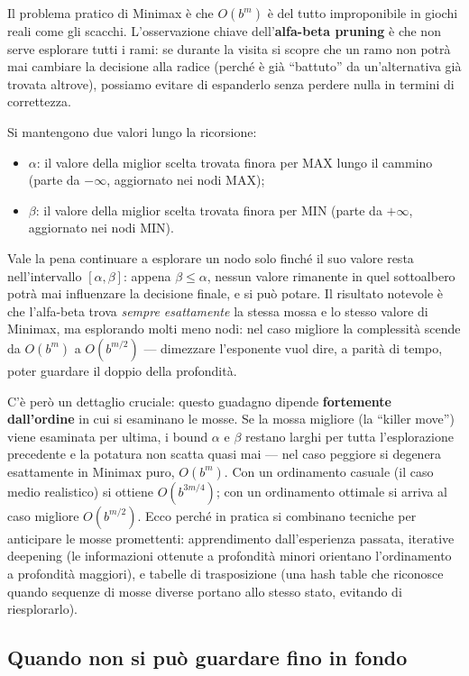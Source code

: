 \documentclass[11pt,a4paper]{article}
\begin{document}
Il problema pratico di Minimax è che $O(b^m)$ è del tutto improponibile in giochi reali come gli scacchi. L'osservazione chiave dell'\textbf{alfa-beta pruning} è che non serve esplorare tutti i rami: se durante la visita si scopre che un ramo non potrà mai cambiare la decisione alla radice (perché è già ``battuto'' da un'alternativa già trovata altrove), possiamo evitare di espanderlo senza perdere nulla in termini di correttezza.

Si mantengono due valori lungo la ricorsione:
\begin{itemize}
  \item $\alpha$: il valore della miglior scelta trovata finora per MAX lungo il cammino (parte da $-\infty$, aggiornato nei nodi MAX);
  \item $\beta$: il valore della miglior scelta trovata finora per MIN (parte da $+\infty$, aggiornato nei nodi MIN).
\end{itemize}

Vale la pena continuare a esplorare un nodo solo finché il suo valore resta nell'intervallo $[\alpha,\beta]$: appena $\beta \le \alpha$, nessun valore rimanente in quel sottoalbero potrà mai influenzare la decisione finale, e si può potare. Il risultato notevole è che l'alfa-beta trova \emph{sempre esattamente} la stessa mossa e lo stesso valore di Minimax, ma esplorando molti meno nodi: nel caso migliore la complessità scende da $O(b^m)$ a $O(b^{m/2})$ --- dimezzare l'esponente vuol dire, a parità di tempo, poter guardare il doppio della profondità.

C'è però un dettaglio cruciale: questo guadagno dipende \textbf{fortemente dall'ordine} in cui si esaminano le mosse. Se la mossa migliore (la ``killer move'') viene esaminata per ultima, i bound $\alpha$ e $\beta$ restano larghi per tutta l'esplorazione precedente e la potatura non scatta quasi mai --- nel caso peggiore si degenera esattamente in Minimax puro, $O(b^m)$. Con un ordinamento casuale (il caso medio realistico) si ottiene $O(b^{3m/4})$; con un ordinamento ottimale si arriva al caso migliore $O(b^{m/2})$. Ecco perché in pratica si combinano tecniche per anticipare le mosse promettenti: apprendimento dall'esperienza passata, iterative deepening (le informazioni ottenute a profondità minori orientano l'ordinamento a profondità maggiori), e tabelle di trasposizione (una hash table che riconosce quando sequenze di mosse diverse portano allo stesso stato, evitando di riesplorarlo).

\subsection{Quando non si può guardare fino in fondo}
\end{document}
